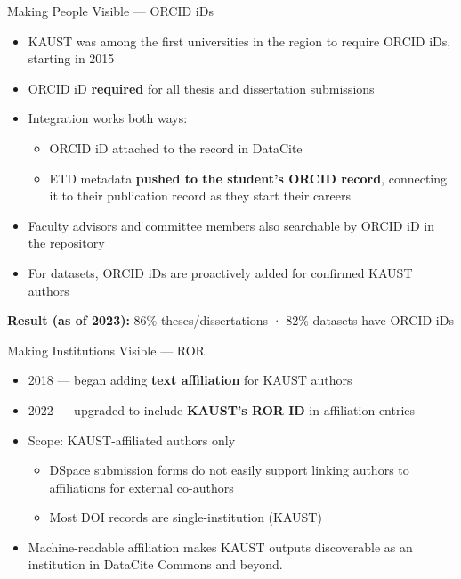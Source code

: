 \documentclass[aspectratio=169]{beamer}
\begin{document}
\begin{frame}{Making People Visible — ORCID iDs}
\begin{itemize}
    \item KAUST was among the first universities in the region to require ORCID iDs, starting in 2015
    \item ORCID iD \textbf{required} for all thesis and dissertation
          submissions
    \item Integration works both ways:
    \begin{itemize}
        \item ORCID iD attached to the record in DataCite
        \item ETD metadata \textbf{pushed to the student's ORCID record},
              connecting it to their publication record as they start
              their careers
    \end{itemize}
    \item Faculty advisors and committee members also searchable
          by ORCID iD in the repository
    \item For datasets, ORCID iDs are proactively added for confirmed KAUST authors
\end{itemize}
\vspace{0.5em}
\textbf{Result (as of 2023):} 86\% theses/dissertations · 82\% datasets have ORCID iDs
\end{frame}

\begin{frame}{Making Institutions Visible — ROR}
\begin{itemize}
    \item 2018 — began adding \textbf{text affiliation} for KAUST authors
    \item 2022 — upgraded to include \textbf{KAUST's ROR ID}
          in affiliation entries
    \item Scope: KAUST-affiliated authors only
    \begin{itemize}
        \item DSpace submission forms do not easily support linking
              authors to affiliations for external co-authors
        \item Most DOI records are single-institution (KAUST)
    \end{itemize}
    \item Machine-readable affiliation makes KAUST outputs discoverable as an institution in DataCite Commons and beyond.
\end{itemize}
\end{frame}
\end{document}
